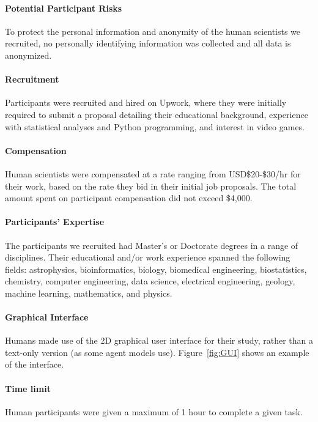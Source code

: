 \paragraph{Potential Participant Risks} To protect the personal information and anonymity of the human scientists we recruited, no personally identifying information was collected and all data is anonymized.

\paragraph{Recruitment} Participants were recruited and hired on Upwork, where they were initially required to submit a proposal detailing their educational background, experience with statistical analyses and Python programming, and interest in video games. 

\paragraph{Compensation} Human scientists were compensated at a rate ranging from USD\$20-\$30/hr for their work, based on the rate they bid in their initial job proposals. The total amount spent on participant compensation did not exceed \$4,000.

\paragraph{Participants' Expertise} The participants we recruited had Master’s or Doctorate degrees in a range of disciplines. Their educational and/or work experience spanned the following fields: astrophysics, bioinformatics, biology, biomedical engineering, biostatistics, chemistry, computer engineering, data science, electrical engineering, geology, machine learning, mathematics, and physics.

\paragraph{Graphical Interface} Humans made use of the 2D graphical user interface for their study, rather than a text-only version (as some agent models use). Figure~\ref{fig:GUI} shows an example of the interface.

\paragraph{Time limit} Human participants were given a maximum of 1 hour to complete a given task. 

